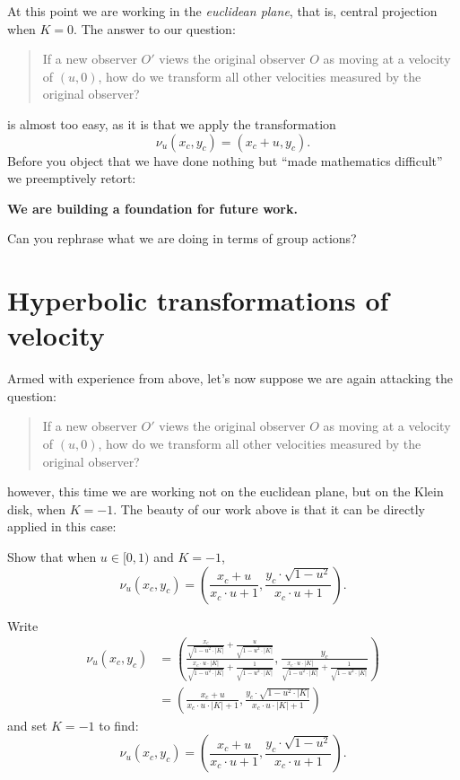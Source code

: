 \documentclass{ximera}
\begin{document}
At this point we are working in the \textit{euclidean plane}, that is,
central projection when $K=0$.
The answer to our question:
\begin{quote}
  If a new observer $O'$ views the original observer $O$ as moving at
  a velocity of $(u,0)$, how do we transform all other velocities
  measured by the original observer?
\end{quote}
is almost too easy, as it is that we apply the transformation
\[
\nu_u(x_c,y_c) = (x_c+u,y_c).
\]
Before you object that we have done nothing but ``made mathematics
difficult'' we preemptively retort:
\begin{center}
  \textbf{We are building a foundation for future work.}
\end{center}

\begin{problem}
  Can you rephrase what we are doing in terms of group actions?
\end{problem}




\section{Hyperbolic transformations of velocity}

Armed with experience from above, let's now suppose we are again attacking the question:
\begin{quote}
  If a new observer $O'$ views the original observer $O$ as moving at
  a velocity of $(u,0)$, how do we transform all other velocities
  measured by the original observer?
\end{quote}
however, this time we are working not on the euclidean plane, but on
the Klein disk, when $K=-1$. The beauty of our work above is that it
can be directly applied in this case:

\begin{problem}
  Show that when $u\in [0,1)$ and $K=-1$,
  \[
  \nu_u(x_c,y_c) = \left(\frac{x_c + u}{x_c\cdot u + 1},\frac{y_c\cdot \sqrt{1-u^2}}{x_c\cdot u+1}\right).
  \]
  \begin{freeResponse}
    Write
    \begin{align*}
    \nu_u(x_c,y_c)&=\left(\frac{\frac{x_c}{\sqrt{1-u^2\cdot|K|}} + \frac{u}{\sqrt{1-u^2\cdot|K|}}}
         {\frac{x_c\cdot u \cdot |K|}{\sqrt{1-u^2\cdot|K|}}+\frac{1}{\sqrt{1-u^2\cdot |K|}}},
         \frac{y_c}{\frac{x_c\cdot u \cdot |K|}{\sqrt{1-u^2\cdot|K|}}+\frac{1}{\sqrt{1-u^2\cdot |K|}}}\right)\\
         &=\left(\frac{x_c + u}{x_c\cdot u \cdot |K|+1},\frac{y_c\cdot \sqrt{1-u^2\cdot|K|}}{x_c\cdot u \cdot |K|+1}\right)
    \end{align*}
    and set $K=-1$ to find:
    \[
    \nu_u(x_c,y_c)=\left(\frac{x_c + u}{x_c\cdot u + 1},\frac{y_c\cdot \sqrt{1-u^2}}{x_c\cdot u+1}\right).
    \]
  \end{freeResponse}
\end{problem}
\end{document}
